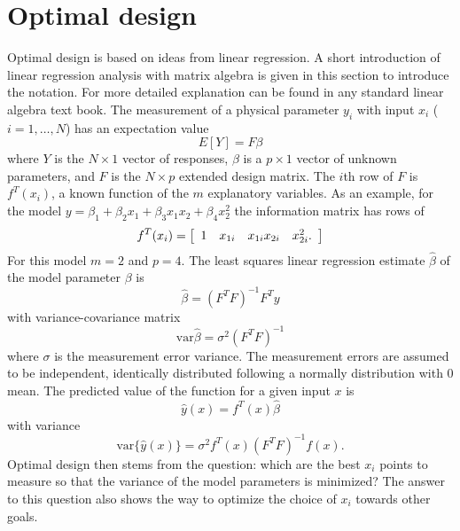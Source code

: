 \documentclass[12pt]{iopart}
\begin{document}
\section{Optimal design}
\label{sec:optdesign}
Optimal design is based on ideas from linear regression. A short introduction of linear regression analysis with matrix algebra is given in this section to introduce the notation. For more detailed explanation can be found in any standard linear algebra text book. The measurement of a physical parameter $y_i$ with input $x_i$ ($i=1, \ldots, N$) has an expectation value
\begin{equation}
E[Y] = F \beta
\end{equation}
where $Y$ is the $N \times 1$ vector of responses, $\beta$ is a $p \times 1$ vector of unknown parameters, and $F$ is the $N \times p$ extended design matrix. The $i$th row of $F$ is $f^T(x_i)$, a known function of the $m$ explanatory variables. As an example, for the model $y = \beta_1 + \beta_2 x_1 + \beta_3 x_1 x_2 + \beta_4 x_2^2$ the information matrix has rows of
\begin{equation}
f^T(x_i) = \left[
	\begin{array}{c c c c}
	1 & x_{1i} & x_{1i}x_{2i} & x_{2i}^2.
	\end{array}\right]
\end{equation}
For this model $m = 2$ and $p = 4$. The least squares linear regression estimate $\hat \beta$ of the model parameter $\beta$ is
\begin{equation}
\hat \beta = (F^T F)^{-1} F^T y
\end{equation}
with variance-covariance matrix
\begin{equation}
\mathrm{var} \hat \beta = \sigma^2 (F^T F)^{-1}
\label{eq:varbeta}
\end{equation}
where $\sigma$ is the measurement error variance. The measurement errors are assumed to be independent, identically distributed following a normally distribution with 0 mean. The predicted value of the function for a given input $x$ is
\begin{equation}
\hat y(x) = f^T(x) \hat \beta
\end{equation}
with variance
\begin{equation}
\mathrm{var}\{\hat y(x)\} = \sigma^2 f^T(x)\left(F^T F\right)^{-1}f(x).
\end{equation}
Optimal design then stems from the question: which are the best $x_i$ points to measure so that the variance of the model parameters is minimized? The answer to this question also shows the way to optimize the choice of $x_i$ towards other goals.
\end{document}
